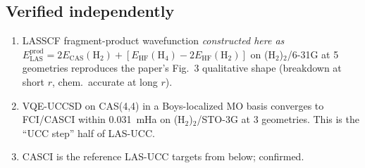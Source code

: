 \documentclass[11pt]{article}
\begin{document}
\subsection{Verified independently}
\begin{enumerate}
    \item LASSCF fragment-product wavefunction \emph{constructed here as} $E_{\text{LAS}}^{\text{prod}} = 2 E_{\text{CAS}}(\text{H}_2) + [E_{\text{HF}}(\text{H}_4) - 2 E_{\text{HF}}(\text{H}_2)]$ on (H$_2$)$_2$/6-31G at 5 geometries reproduces the paper's Fig.~3 qualitative shape (breakdown at short $r$, chem.\ accurate at long $r$).
    \item VQE-UCCSD on CAS(4,4) in a Boys-localized MO basis converges to FCI/CASCI within 0.031~mHa on (H$_2$)$_2$/STO-3G at 3 geometries. This is the ``UCC step'' half of LAS-UCC.
    \item CASCI is the reference LAS-UCC targets from below; confirmed.
\end{enumerate}
\end{document}
